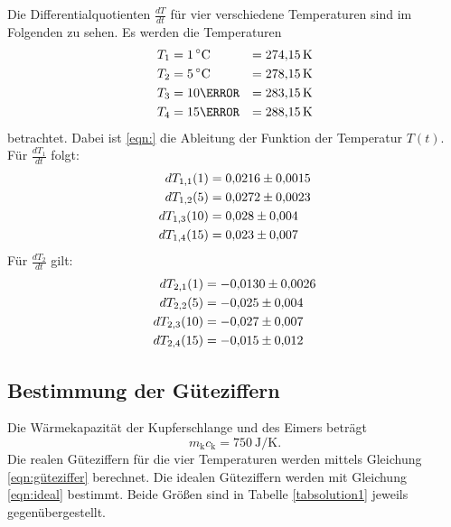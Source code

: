 Die Differentialquotienten $\frac{dT}{dt}$ für vier verschiedene Temperaturen
sind im Folgenden zu sehen. Es werden die Temperaturen
\begin{align*}
    T_1 &= \SI{1}{\celsius} &= \SI{274.15}{\kelvin} \\ %
    T_2 &= \SI{5}{\celsius} &= \SI{278.15}{\kelvin}\\
    T_3 &= \num{10}{\celsius} &= \SI{283.15}{\kelvin}\\
    T_4 &= \num{15}{\celsius} &= \SI{288.15}{\kelvin}
\end{align*}
betrachtet.
Dabei ist \eqref{eqn:} %
die Ableitung der Funktion der Temperatur $T(t)$.
Für $\frac{dT_1}{dt}$ folgt:
\begin{align*}
    dT_{1,1}(1) &= \num{0.0216 \pm 0.0015} \\
    dT_{1,2}(5) &= \num{0.0272 \pm 0.0023} \\
    dT_{1,3}(10) &= \num{0.028 \pm 0.004} \\
    dT_{1,4}(15) &= \num{0.023 \pm 0.007} %
\end{align*}
Für $\frac{dT_2}{dt}$ gilt:
\begin{align*}
    dT_{2,1}(1) &= \num{-0.0130 \pm 0.0026} \\ %
    dT_{2,2}(5) &= \num{-0.025 \pm 0.004} \\
    dT_{2,3}(10) &= \num{-0.027 \pm 0.007} \\
    dT_{2,4}(15) &= \num{-0.015 \pm 0.012}
\end{align*}

\subsection{Bestimmung der Güteziffern}
Die Wärmekapazität der Kupferschlange und des Eimers beträgt
\begin{equation*}
    m_\text{k} c_\text{k} = \SI{750}{\joule\per\kelvin}.
\end{equation*}
Die realen Güteziffern für die vier Temperaturen werden mittels
Gleichung \eqref{eqn:güteziffer} berechnet. %
Die idealen Güteziffern werden mit Gleichung \eqref{eqn:ideal} %
bestimmt.
Beide Größen sind in Tabelle \ref{tabsolution1} jeweils
gegenübergestellt.


